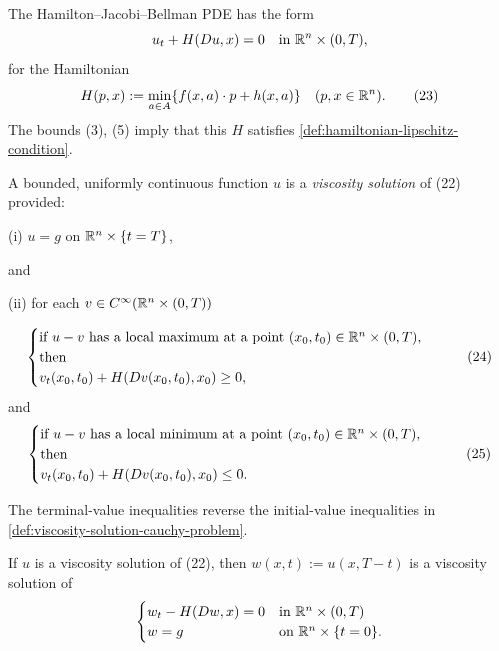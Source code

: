 \begin{remark}
\label{rem:hjb-hamiltonian-formula}

The Hamilton--Jacobi--Bellman PDE has the form
\[
u_t + H(Du, x) = 0 \quad \text{in } \mathbb{R}^n \times (0,T),
\]
for the Hamiltonian
\[
H(p,x) := \min_{a \in A}\{f(x,a) \cdot p + h(x,a)\} \quad (p, x \in \mathbb{R}^n).
\tag{23}
\]
The bounds (3), (5) imply that this $H$ satisfies \cref{def:hamiltonian-lipschitz-condition}.
\end{remark}

\begin{definition}
\label{def:viscosity-solution-terminal-value-problem}

A bounded, uniformly continuous function $u$ is a \textit{viscosity solution} of (22) provided:

(i) $u = g$ on $\mathbb{R}^n \times \{t = T\}$,

and

(ii) for each $v \in C^\infty(\mathbb{R}^n \times (0,T))$

\[
\begin{cases}
\text{if } u - v \text{ has a local maximum at a point } (x_0, t_0) \in \mathbb{R}^n \times (0,T), \\
\text{then} \\
v_t(x_0, t_0) + H(Dv(x_0, t_0), x_0) \geq 0,
\end{cases}
\tag{24}
\]
and
\[
\begin{cases}
\text{if } u - v \text{ has a local minimum at a point } (x_0, t_0) \in \mathbb{R}^n \times (0,T), \\
\text{then} \\
v_t(x_0, t_0) + H(Dv(x_0, t_0), x_0) \leq 0.
\end{cases}
\tag{25}
\]

The terminal-value inequalities reverse the initial-value inequalities in \cref{def:viscosity-solution-cauchy-problem}.
\end{definition}

\begin{remark}
\label{rem:terminal-value-time-reversal}

If $u$ is a viscosity solution of (22), then $w(x,t):=u(x,T-t)$ is a viscosity solution of
\[
\begin{cases}
w_t - H(Dw, x) = 0 & \text{in } \mathbb{R}^n \times (0,T) \\
w = g & \text{on } \mathbb{R}^n \times \{t = 0\}.
\end{cases}
\]
\end{remark}

